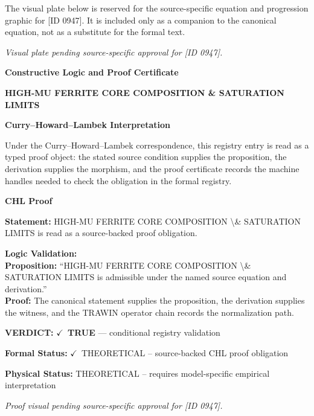\begingroup\footnotesize\sloppy
The visual plate below is reserved for the source-specific equation and progression graphic for [ID 0947]. It is included only as a companion to the canonical equation, not as a substitute for the formal text.
\par\endgroup
\begingroup\footnotesize\itshape
Visual plate pending source-specific approval for [ID 0947].
\par\endgroup

\clearpage
\begingroup\tzpsupportsetup
\noindent\textbf{\fontsize{10.8pt}{12.8pt}\selectfont [ID 0947] Constructive Logic and Proof Certificate}\par
\noindent\textbf{\fontsize{10pt}{12pt}\selectfont HIGH-MU FERRITE CORE COMPOSITION \& SATURATION LIMITS}\par
\vspace{0.45em}
\begingroup
\footnotesize
\setlength{\parskip}{0.22em}
\setlength{\parindent}{0pt}
\noindent\textbf{Curry--Howard--Lambek Interpretation}\par
Under the Curry--Howard--Lambek correspondence, this registry entry is read as a typed proof
object: the stated source condition supplies the proposition, the derivation supplies the
morphism, and the proof certificate records the machine handles needed to check the obligation
in the formal registry.

\vspace{0.45em}
\noindent\textbf{CHL Proof}\par
\textbf{Statement:} HIGH-MU FERRITE CORE COMPOSITION \textbackslash{}\& SATURATION LIMITS is read as a source-backed proof obligation.

\textbf{Logic Validation:}\\
\textbf{Proposition:} ``HIGH-MU FERRITE CORE COMPOSITION \textbackslash{}\& SATURATION LIMITS is admissible under the named source equation and derivation.''\\
\textbf{Proof:} The canonical statement supplies the proposition, the derivation supplies the witness, and the TRAWIN operator chain records the normalization path.

\textbf{VERDICT:} \ensuremath{\checkmark}\ \textbf{TRUE} --- conditional registry validation

\textbf{Formal Status:} \ensuremath{\checkmark}\ THEORETICAL -- source-backed CHL proof obligation

\textbf{Physical Status:} THEORETICAL -- requires model-specific empirical interpretation
\par\vspace{0.45em}
\par
\vfill
\begingroup\footnotesize\itshape
Proof visual pending source-specific approval for [ID 0947].
\par\endgroup
\vfill
\endgroup
\endgroup
